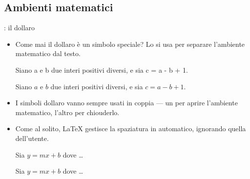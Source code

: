 \documentclass{beamer}
\begin{document}
\subsection{Ambienti matematici}
\begin{frame}[fragile]{\insertsubsection{}: il dollaro}
\begin{itemize}
\item Come mai il dollaro \keystrokebftt{\$} \`e un simbolo speciale?
Lo si usa per separare l'ambiente matematico dal testo.\\[1ex]
\begin{exampletwouptiny}
Siano a e b due interi positivi
diversi, e sia c = a - b + 1.

Siano $a$ e $b$ due interi positivi
diversi, e sia $c = a - b + 1$.
\end{exampletwouptiny}
\item I simboli dollaro vanno sempre usati in coppia --- un per aprire l'ambiente
matematico, l'altro per chiouderlo.
\item Come al solito, \LaTeX{} gestisce la spaziatura in automatico,
ignorando quella dell'utente.
\begin{exampletwouptiny}
Sia $y=mx+b$ dove \ldots

Sia $y = m x + b$ dove \ldots
\end{exampletwouptiny}
\end{itemize}
\end{frame}
\end{document}

